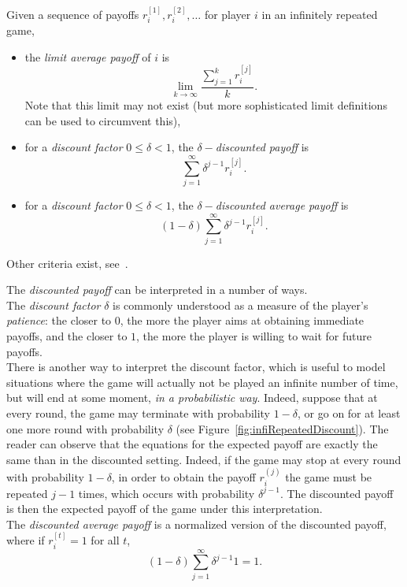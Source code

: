 \begin{definition}
Given a sequence of payoffs $r_i^{[1]}, r_i^{[2]}, \ldots$ for player $i$
in an infinitely repeated game,
\begin{itemize}
    \item the \emph{limit average payoff} of $i$ is
    \begin{equation}
        \lim_{k \rightarrow \infty} \frac{\sum_{j = 1}^k r_i^{[j]}}{k}.
        \label{eq:averagePayoffRep}
    \end{equation}
    Note that this limit may not exist (but more sophisticated
    limit definitions can be used to circumvent this),
    \item for a \emph{discount factor} $0 \leq \delta < 1$, the
    \emph{$\delta-$discounted payoff} is
    \begin{equation}
        \sum_{j = 1}^{\infty} \delta^{j-1} r_i^{[j]}.
        \label{eq:discountedPayoffRep}
    \end{equation}
    \item for a \emph{discount factor} $0 \leq \delta < 1$, the
    \emph{$\delta-$discounted average payoff} is
    \begin{equation}
        (1-\delta) \sum_{j = 1}^{\infty} \delta^{j-1} r_i^{[j]}.
        \label{eq:discountedAvgPayoffRep}
    \end{equation}
\end{itemize}
\end{definition}
Other criteria exist, see~\cite[page 315]{MyGTAO}.

The \emph{discounted payoff} can be interpreted in a number of ways.\\
The \emph{discount factor} $\delta$ is commonly understood as a measure
of the player's \emph{patience}: the closer to $0$, the more the player
aims at obtaining immediate payoffs, and the closer to $1$, the more the
player is willing to wait for future payoffs.\\
There is another way to interpret the discount factor, which is useful to model situations where the game will actually not be played an infinite number of time, but will end at some moment, \emph{in a probabilistic way}. Indeed, suppose that at every round, the game may terminate with probability $1-\delta$, or go on for at least one more round with probability $\delta$ (see Figure~\ref{fig:infiRepeatedDiscount}). The reader can observe that the equations for the expected payoff are exactly the same than in the discounted setting.  Indeed, if the game may stop at every round with probability $1-\delta$, in order to obtain the payoff $r_i^{(j)}$ the game must be repeated $j-1$ times, which occurs with probability $\delta^{j-1}$. The discounted payoff is then the
expected payoff of the game under this interpretation.\\
The \emph{discounted average payoff} is a normalized version of the
discounted payoff, where if $r_i^{[t]} = 1$ for all $t$,
$$(1-\delta) \sum_{j = 1}^{\infty} \delta^{j-1} 1 = 1.$$

